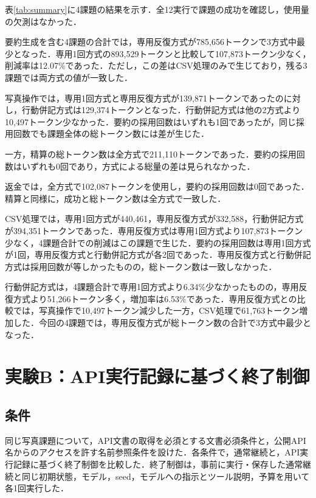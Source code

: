 \documentclass[letter]{ieicej}
\begin{document}
表\ref{tab:summary}に4課題の結果を示す．全12実行で課題の成功を確認し，使用量の欠測はなかった．

\SummaryResultsTable

要約生成を含む4課題の合計では，専用反復方式が785,656トークンで3方式中最少となった．専用1回方式の893,529トークンと比較して107,873トークン少なく，削減率は12.07\%であった．ただし，この差はCSV処理のみで生じており，残る3課題では両方式の値が一致した．

写真操作では，専用1回方式と専用反復方式が139,871トークンであったのに対し，行動併記方式は129,374トークンとなった．行動併記方式は他の2方式より10,497トークン少なかった．要約の採用回数はいずれも1回であったが，同じ採用回数でも課題全体の総トークン数には差が生じた．

一方，精算の総トークン数は全方式で211,110トークンであった．要約の採用回数はいずれも0回であり，方式による総量の差は見られなかった．

返金では，全方式で102,087トークンを使用し，要約の採用回数は0回であった．精算と同様に，成功と総トークン数は全方式で一致した．

CSV処理では，専用1回方式が440,461，専用反復方式が332,588，行動併記方式が394,351トークンであった．専用反復方式は専用1回方式より107,873トークン少なく，4課題合計での削減はこの課題で生じた．要約の採用回数は専用1回方式が1回，専用反復方式と行動併記方式が各2回であった．専用反復方式と行動併記方式は採用回数が等しかったものの，総トークン数は一致しなかった．

行動併記方式は，4課題合計で専用1回方式より6.34\%少なかったものの，専用反復方式より51,266トークン多く，増加率は6.53\%であった．専用反復方式との比較では，写真操作で10,497トークン減少した一方，CSV処理で61,763トークン増加した．今回の4課題では，専用反復方式が総トークン数の合計で3方式中最少となった．

\section{実験B：API実行記録に基づく終了制御}

\subsection{条件}

同じ写真課題について，API文書の取得を必須とする文書必須条件と，公開API名からのアクセスを許す名前参照条件を設けた．各条件で，通常継続と，API実行記録に基づく終了制御を比較した．終了制御は，事前に実行・保存した通常継続と同じ初期状態，モデル，seed，モデルへの指示とツール説明，予算を用いて各1回実行した．
\end{document}
